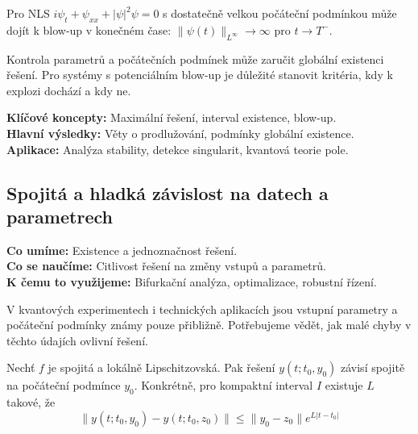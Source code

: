 \begin{example}
Pro NLS $i\psi_t + \psi_{xx} + |\psi|^2\psi = 0$ s dostatečně velkou počáteční podmínkou může dojít k blow-up v konečném čase: $\|\psi(t)\|_{L^\infty} \to \infty$ pro $t \to T^-$.
\end{example}

\begin{keyinsight}
Kontrola parametrů a počátečních podmínek může zaručit globální existenci řešení. Pro systémy s potenciálním blow-up je důležité stanovit kritéria, kdy k explozi dochází a kdy ne.
\end{keyinsight}

\begin{summary}
\textbf{Klíčové koncepty:} Maximální řešení, interval existence, blow-up. \\
\textbf{Hlavní výsledky:} Věty o prodlužování, podmínky globální existence. \\
\textbf{Aplikace:} Analýza stability, detekce singularit, kvantová teorie pole.
\end{summary}

\spc

\subsection{Spojitá a hladká závislost na datech a parametrech}

\begin{scaffold}
\textbf{Co umíme:} Existence a jednoznačnost řešení. \\
\textbf{Co se naučíme:} Citlivost řešení na změny vstupů a parametrů. \\
\textbf{K čemu to využijeme:} Bifurkační analýza, optimalizace, robustní řízení.
\end{scaffold}

\begin{motivation}
V kvantových experimentech i technických aplikacích jsou vstupní parametry a počáteční podmínky známy pouze přibližně. Potřebujeme vědět, jak malé chyby v těchto údajích ovlivní řešení.
\end{motivation}

\begin{theorem}
Nechť $f$ je spojitá a lokálně Lipschitzovská. Pak řešení $y(t; t_0, y_0)$ závisí spojitě na počáteční podmínce $y_0$. Konkrétně, pro kompaktní interval $I$ existuje $L$ takové, že
\[
\|y(t; t_0, y_0) - y(t; t_0, z_0)\| \leq \|y_0 - z_0\|e^{L|t-t_0|}
\]
\end{theorem}

